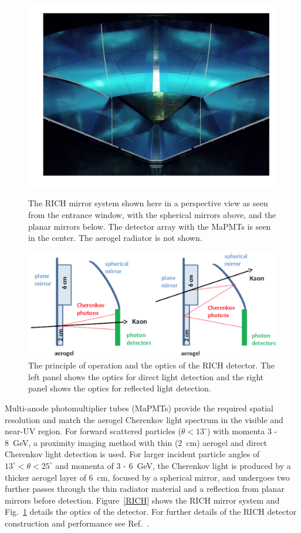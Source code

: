 \documentclass[final,3p]{elsarticle}
\begin{document}
\begin{twocolumn}
\begin{figure}[t!]
\centerline{\includegraphics[width=1.0\columnwidth]{rich-mirrors.png}}
\caption{The RICH mirror system shown here in a perspective view as seen from the entrance window, with the
  spherical mirrors above, and the planar mirrors below. The detector array with the MaPMTs is seen in the center.
  The aerogel radiator is not shown.}
\label{RICH}
\includegraphics[width=1.0\columnwidth]{rich.png}
\caption{The principle of operation and the optics of the RICH detector. The left panel shows the optics for direct
  light detection and the right panel shows the optics for reflected light detection.}
\label{RICH-optics}
\end{figure}

Multi-anode photomultiplier tubes (MaPMTs) provide the required spatial resolution and match the aerogel
Cherenkov light spectrum in the visible and near-UV region. For forward scattered particles ($\theta < 13^\circ$)
with momenta 3 - 8~GeV, a proximity imaging method with thin (2~cm) aerogel and direct Cherenkov light detection
is used. For larger incident particle angles of $13^\circ < \theta < 25^\circ$ and momenta of 3 - 6~GeV, the Cherenkov
light is produced by a thicker aerogel layer of 6~cm, focused by a spherical mirror, and undergoes two further passes
through the thin radiator material and a reflection from planar mirrors before detection. Figure~\ref{RICH} shows
the RICH mirror system and Fig.~\ref{RICH-optics} details the optics of the detector. For further details of the
RICH detector construction and performance see Ref.~\cite{RICH}.


\end{twocolumn}
\end{document}
